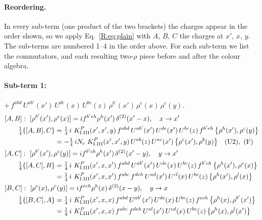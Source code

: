 \documentclass[10pt]{article}
\numberwithin{equation}{section}
\begin{document}
\paragraph{Reordering.} In every sub-term (one product of the two brackets) the charges appear in the order shown, so we apply Eq.~\eqref{R:eq:plain} with $A$, $B$, $C$ the charges at $x'$, $x$, $y$. The sub-terms are numbered 1--4 in the order above. For each sub-term we list the commutators, and each resulting two-$\rho$ piece before and after the colour algebra.
\paragraph{Sub-term 1:} $+\,f^{abd}\,U^{ab'}(x')\,U^{de}(x)\,U^{bc}(z)\,\rho^{b'}(x')\,\rho^{e}(x)\,\rho^{c}(y)$.
\begin{align}
&[A,B]:\ [\rho^{b'}(x'),\rho^{e}(x)]=i f^{b'eh}\rho^{h}(x')\,\delta^{(2)}(x'-x),\quad x\to x'\notag\\
&\qquad \tfrac14\{[A,B],C\}=\tfrac14\,i\,\,K^{P}_{\rm I.III}(x',x',y)\,f^{abd}\,U^{ab'}(x')\,U^{de}(x')\,U^{bc}(z)\,f^{b'eh}\,\big\{\rho^{h}(x'),\rho^{c}(y)\big\}\notag\\
&\qquad\phantom{\tfrac14\{[A,B],C\}}=-\tfrac14\,i N_{c}\,\,K^{P}_{\rm I.III}(x',x',y)\,U^{ab}(z)\,U^{ac}(x')\,\big\{\rho^{c}(x'),\rho^{b}(y)\big\}\quad\text{(U2)},\ \text{(F)}
\label{B:eq:GI.III.P-1-AB}\\
&[A,C]:\ [\rho^{b'}(x'),\rho^{c}(y)]=i f^{b'ch}\rho^{h}(x')\,\delta^{(2)}(x'-y),\quad y\to x'\notag\\
&\qquad \tfrac14\{[A,C],B\}=\tfrac14\,i\,\,K^{P}_{\rm I.III}(x',x,x')\,f^{abd}\,U^{ab'}(x')\,U^{de}(x)\,U^{bc}(z)\,f^{b'ch}\,\big\{\rho^{h}(x'),\rho^{e}(x)\big\}\notag\\
&\qquad\phantom{\tfrac14\{[A,C],B\}}=\tfrac14\,i\,\,K^{P}_{\rm I.III}(x',x,x')\,f^{abc}\,f^{deh}\,U^{ad}(x')\,U^{cl}(x)\,U^{be}(z)\,\big\{\rho^{h}(x'),\rho^{l}(x)\big\}
\label{B:eq:GI.III.P-1-AC}\\
&[B,C]:\ [\rho^{e}(x),\rho^{c}(y)]=i f^{ech}\rho^{h}(x)\,\delta^{(2)}(x-y),\quad y\to x\notag\\
&\qquad \tfrac14\{[B,C],A\}=\tfrac14\,i\,\,K^{P}_{\rm I.III}(x',x,x)\,f^{abd}\,U^{ab'}(x')\,U^{de}(x)\,U^{bc}(z)\,f^{ech}\,\big\{\rho^{h}(x),\rho^{b'}(x')\big\}\notag\\
&\qquad\phantom{\tfrac14\{[B,C],A\}}=\tfrac14\,i\,\,K^{P}_{\rm I.III}(x',x,x)\,f^{abc}\,f^{deh}\,U^{al}(x')\,U^{cd}(x)\,U^{be}(z)\,\big\{\rho^{h}(x),\rho^{l}(x')\big\}
\label{B:eq:GI.III.P-1-BC}
\end{align}
\end{document}
